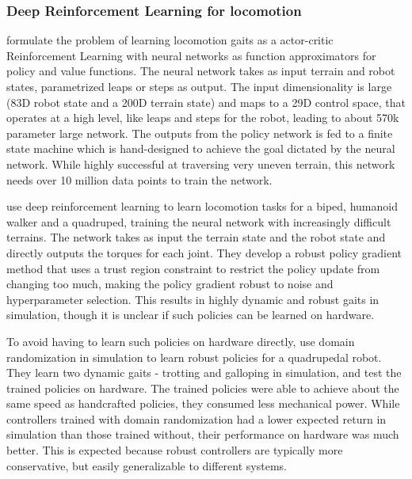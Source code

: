 \subsubsection{Deep Reinforcement Learning for locomotion}
\label{sec:deepRL}

\cite{peng2016terrain} formulate the problem of learning locomotion gaits as a actor-critic Reinforcement Learning with neural networks as function approximators for policy and value functions. The neural network takes as input terrain and robot states, parametrized leaps or steps as output. The input dimensionality is large (83D robot state and a 200D terrain state) and maps to a 29D control space, that operates at a high level, like leaps and steps for the robot, leading to about 570k parameter large network. The outputs from the policy network is fed to a finite state machine which is hand-designed to achieve the goal dictated by the neural network. While highly successful at traversing very uneven terrain, this network needs over 10 million data points to train the network. 

\cite{heess2017emergence} use deep reinforcement learning to learn locomotion tasks for a biped, humanoid walker and a quadruped, training the neural network with increasingly difficult terrains. The network takes as input the terrain state and the robot state and directly outputs the torques for each joint. They develop a robust policy gradient method that uses a trust region constraint to restrict the policy update from changing too much, making the policy gradient robust to noise and hyperparameter selection. This results in highly dynamic and robust gaits in simulation, though it is unclear if such policies can be learned on hardware.

To avoid having to learn such policies on hardware directly, \cite{tan2018sim} use domain randomization in simulation to learn robust policies for a quadrupedal robot. They learn two dynamic gaits - trotting and galloping in simulation, and test the trained policies on hardware. The trained policies were able to achieve about the same speed as handcrafted policies, they consumed less mechanical power. While controllers trained with domain randomization had a lower expected return in simulation than those trained without, their performance on hardware was much better. This is expected because robust controllers are typically more conservative, but easily generalizable to different systems.

